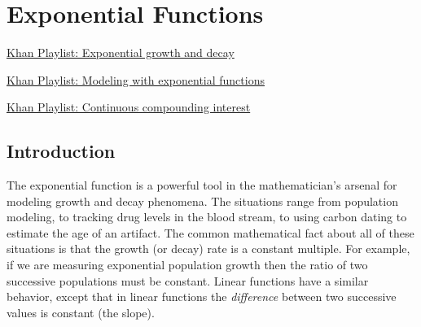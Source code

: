 \section{Exponential Functions} \label{S:0.2.Exponentials}


\vspace*{-14 pt}


\begin{web}
\item
    \href{https://www.khanacademy.org/math/algebra2/exponential_and_logarithmic_func/exp_growth_decay/v/exponential-growth-functions}{Khan
    Playlist: Exponential growth and decay}
\item
    \href{https://www.khanacademy.org/math/algebra2/exponential_and_logarithmic_func/exponential-modeling}{Khan
    Playlist: Modeling with exponential functions}
\item
    \href{https://www.khanacademy.org/math/algebra2/exponential_and_logarithmic_func/continuous_compounding}{Khan
    Playlist: Continuous compounding interest}
\end{web}

\nin \hrulefill


\subsection*{Introduction}
The exponential function is a powerful tool in the mathematician's arsenal for modeling
growth and decay phenomena.  The situations range from population modeling, to tracking
drug levels in the blood stream, to using carbon dating to estimate the age of an
artifact.  The common mathematical fact about all of these situations is that the growth
(or decay) rate is a constant multiple.  For example, if we are measuring exponential population
growth then the ratio of two successive populations must be constant.  Linear functions
have a similar behavior, except that in linear functions the {\it difference} between two
successive values is constant (the slope).  


